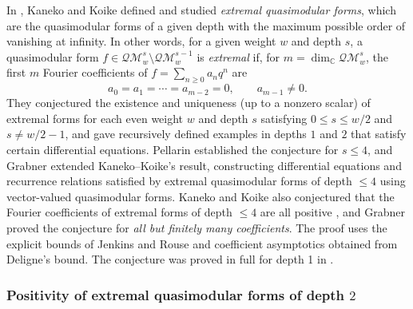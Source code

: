\documentclass[10pt,reqno]{amsproc}
\newcommand{\QM}{\mathcal{QM}}
\newcommand{\1}{\mathds{1}}	%
\theoremstyle{definition}
\theoremstyle{remark}
\begin{document}
In \cite{kaneko2006extremal}, Kaneko and Koike defined and studied \emph{extremal quasimodular forms}, which are the quasimodular forms of a given depth with the maximum possible order of vanishing at infinity.
In other words, for a given weight $w$ and depth $s$, a quasimodular form $f \in \QM_{w}^{s} \setminus \QM_{w}^{s-1}$ is \emph{extremal} if, for $m = \dim_\mathbb{C} \QM_{w}^{s}$, the first $m$ Fourier coefficients of $f = \sum_{n \geq 0} a_n q^n$ are
\[
    a_0 = a_1 = \cdots = a_{m-2} = 0, \qquad a_{m-1} \neq 0.
\]
They conjectured the existence and uniqueness (up to a nonzero scalar) of extremal forms for each even weight $w$ and depth $s$ satisfying $0 \leq s \leq w/2$ and $s \neq w/2 - 1$, and gave recursively defined examples in depths $1$ and $2$ that satisfy certain differential equations.
Pellarin \cite{pellarin2020extremal} established the conjecture for $s \leq 4$, and
Grabner \cite{grabner2020quasimodular} extended Kaneko--Koike's result, constructing differential equations and recurrence relations satisfied by extremal quasimodular forms of depth $\leq 4$ using vector-valued quasimodular forms.
Kaneko and Koike also conjectured that the Fourier coefficients of extremal forms of depth $\leq 4$ are all positive \cite[Conjecture 2]{kaneko2006extremal}, and Grabner \cite{grabner2022asymptotic} proved the conjecture for \emph{all but finitely many coefficients}.
The proof uses the explicit bounds of Jenkins and Rouse \cite{jenkins2011bounds} and coefficient asymptotics obtained from Deligne's bound.
The conjecture was proved in full for depth 1 in \cite[Corollary 4.4]{lee2024algebraic}.


\subsubsection{Positivity of extremal quasimodular forms of depth $2$}
\end{document}
